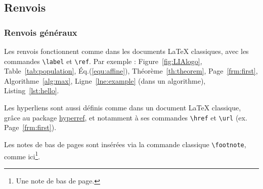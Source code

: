 \documentclass[10pt,    %
    french,             %
    xcolor=table,       %
    envcountsect        %
]{beamer}
\begin{document}
\subsection{Renvois}
\begin{frame}
    \frametitle{Renvois généraux} 
    
    Les renvois fonctionnent comme dans les documents \LaTeX{} classiques, avec les commandes \texttt{\textbackslash{}label} et \texttt{\textbackslash{}ref}. Par exemple : Figure~\ref{fig:LIAlogo}, Table~\ref{tab:population}, Éq.(\ref{equ:affine}), Théorème~\ref{th:theorem}, Page~\ref{frm:first}, Algorithme~\ref{alg:max}, Ligne~\ref{lne:example} (dans un algorithme), Listing~\ref{lst:hello}.
    
    \vspace{0.25cm}
    Les hyperliens sont aussi définis comme dans un document \LaTeX{} classique, grâce au package \href{https://ctan.org/pkg/hyperref?lang=en}{hyperref}, et notamment à ses commandes \texttt{\textbackslash{}href} et \texttt{\textbackslash{}url} (ex. Page~\ref{frm:first}).
    
    \vspace{0.25cm}
    Les notes de bas de pages sont insérées via la commande classique \texttt{\textbackslash{}footnote}, comme ici\footnote{Une note de bas de page.}.
\end{frame}
\end{document}
